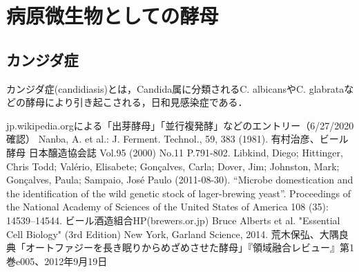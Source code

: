 \documentclass[uplatex, dvipdfmx]{jsarticle}
\begin{document}
\section{病原微生物としての酵母}

\subsection{カンジダ症}
カンジダ症(candidiasis)とは，Candida属に分類されるC. albicansやC. glabrataなどの酵母により引き起こされる，日和見感染症である．


\begin{thebibliography}{9}
        jp.wikipedia.orgによる「出芽酵母」「並行複発酵」などのエントリー（6/27/2020確認）
        Nanba, A. et al.: J. Ferment. Technol., 59, 383 (1981).
        有村治彦、ビール酵母 日本醸造協会誌 Vol.95 (2000) No.11 P.791-802.
        Libkind, Diego; Hittinger, Chris Todd; Valério, Elisabete; Gonçalves, Carla; Dover, Jim; Johnston, Mark; Gonçalves, Paula; Sampaio, José Paulo (2011-08-30). “Microbe domestication and the identification of the wild genetic stock of lager-brewing yeast”. Proceedings of the National Academy of Sciences of the United States of America 108 (35): 14539–14544.
        ビール酒造組合HP(brewers.or.jp)
        Bruce Alberts et al. "Essential Cell Biology" (3rd Edition)
        New York, Garland Science, 2014.
        荒木保弘、大隅良典「オートファジーを長き眠りからめざめさせた酵母」『領域融合レビュー』第1巻e005、2012年9月19日
\end{thebibliography}
\end{document}
